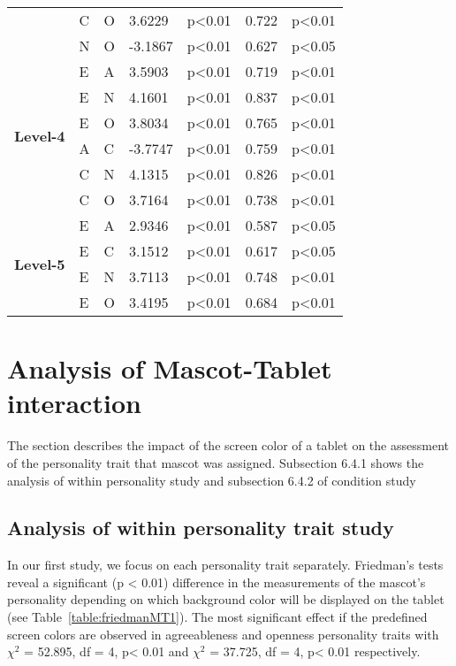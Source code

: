 \begin{longtable}{ |p{1.3cm}| p{0.5cm}|p{0.5cm}|p{1.2cm}| p{1.7cm}|p{1cm}|p{1.5cm}|  }
&C		&O			&3.6229			&p<0.01			& 0.722		&p<0.01\\
&N		&O			&-3.1867			&p<0.01			&0.627 		&p<0.05\\
\hline 
\hline 
\multirow{6}{*}{\textbf{Level-4}} 
&E		&A			&3.5903			&p<0.01			&0.719 		&p<0.01\\
&E		&N			&4.1601			&p<0.01			&0.837 		&p<0.01\\
&E		&O			&3.8034			&p<0.01			&0.765		&p<0.01\\
&A		&C			&-3.7747			&p<0.01			&0.759 		&p<0.01\\
&C		&N			&4.1315			&p<0.01			&0.826 		&p<0.01\\
&C		&O			&3.7164			&p<0.01			&0.738 		&p<0.01\\
\hline 
\hline 
\multirow{4}{*}{\textbf{Level-5}} 
&E		&A			&2.9346			&p<0.01			&0.587 		&p<0.05\\
&E		&C			&3.1512			&p<0.01			&0.617 		&p<0.05\\
&E		&N			&3.7113			&p<0.01			&0.748 		&p<0.01\\
&E		&O			&3.4195			&p<0.01			&0.684 		&p<0.01\\
\hline 
\end{longtable}

\section{Analysis of Mascot-Tablet interaction}
\label{M-T}
The section describes the impact of the screen color of a tablet on the assessment of the personality trait that
mascot was assigned. Subsection 6.4.1 shows the analysis of within personality study and subsection 6.4.2 of condition study

\subsection{Analysis of within personality trait study}
\label{Study1(M-T)}
In our first study, we focus on each personality trait separately. Friedman’s tests reveal a significant (p < 0.01)
difference in the measurements of the mascot’s personality depending on which background color will be displayed
on the tablet (see Table~\ref{table:friedmanMT1}). The most significant effect if the predefined screen colors are
observed in agreeableness and openness personality traits with $\chi^2$ = 52.895, df = 4, p< 0.01 and $\chi^2$ = 37.725,
df = 4, p< 0.01 respectively.

